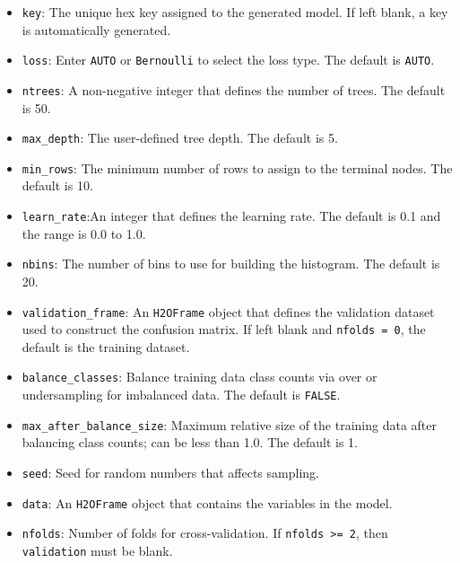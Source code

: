 \documentclass{article}[11pt]
\begin{document}
{\begin{itemize}
\item {\texttt{key}}: The unique hex key assigned to the generated model. If left blank, a key is automatically generated. 

\item \texttt{loss}: Enter {\texttt{AUTO}} or {\texttt{Bernoulli}} to select the loss type. The default is {\texttt{AUTO}}. 

\item {\texttt{ntrees}}: A non-negative integer that defines the number of trees. The default is 50. 

\item {\texttt{max\_depth}}: The user-defined tree depth. The default is 5. 

\item {\texttt{min\_rows}}: The minimum number of rows to assign to the terminal nodes. The default is 10. 

\item {\texttt{learn\_rate}}:An integer that defines the learning rate. The default is 0.1 and the range is 0.0 to 1.0. 

\item {\texttt{nbins}}: The number of bins to use for building the histogram. The default is 20. 

\item {\texttt{validation\_frame}}: An {\texttt{H2OFrame}} object that defines the validation dataset used to construct the confusion matrix. If left blank and {\texttt{nfolds = 0}}, the default is the training dataset.

\item {\texttt{balance\_classes}}: Balance training data class counts via over or undersampling for imbalanced data. The default is {\texttt{FALSE}}. 

\item {\texttt{max\_after\_balance\_size}}: Maximum relative size of the training data after balancing class counts; can be less than 1.0.  The default is 1. 

\item {\texttt{seed}}: Seed for random numbers that affects sampling. 

\item {\texttt{data}}: An {\texttt{H2OFrame}} object that contains the variables in the model. 

\item {\texttt{nfolds}}: Number of folds for cross-validation. If {\texttt{nfolds >= 2}}, then {\texttt{validation}} must be blank. 


\end{itemize}}
\end{document}
